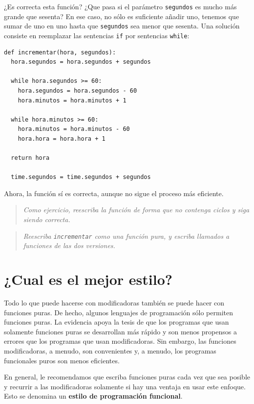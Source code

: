 ¿Es correcta esta función? ¿Que pasa si el parámetro
 \texttt{segundos} es mucho más grande que sesenta?
 En ese caso, no sólo es suficiente añadir uno, tenemos
que sumar de uno en uno hasta que  \texttt{segundos} sea
menor que sesenta.
Una solución consiste en reemplazar las sentencias  \texttt{if}  por sentencias \texttt{while}:

\beforeverb
\begin{verbatim}
def incrementar(hora, segundos):
  hora.segundos = hora.segundos + segundos

  while hora.segundos >= 60:
    hora.segundos = hora.segundos - 60
    hora.minutos = hora.minutos + 1

  while hora.minutos >= 60:
    hora.minutos = hora.minutos - 60
    hora.hora = hora.hora + 1

  return hora

  time.segundos = time.segundos + segundos

\end{verbatim}
\afterverb
%
Ahora, la función sí es correcta, aunque no sigue el proceso
 más eficiente. 

\begin{quote}
{\em Como ejercicio, reescriba la función de forma que no
contenga ciclos y siga siendo correcta.}
\end{quote}

\begin{quote}
{\em Reescriba \texttt{incrementar} como una función 
pura, y escriba llamados a funciones de las dos versiones.}
\end{quote}


\section{¿Cual es el mejor estilo?}


Todo lo que puede hacerse con modificadoras también se 
puede hacer con funciones puras. De hecho, algunos lenguajes
de programación sólo permiten funciones puras. La evidencia
apoya la tesis de que los programas que usan solamente 
funciones puras se desarrollan más rápido y son menos
propensos a errores que los programas que usan modificadoras.
Sin embargo, las funciones modificadoras, a menudo, son 
convenientes y, a menudo, los programas funcionales puros
son menos eficientes.

En general, le recomendamos que escriba funciones puras 
cada vez que sea posible y recurrir a las modificadoras
solamente si hay una ventaja en usar este enfoque. Esto
se denomina un {\bf estilo de programación funcional}.


